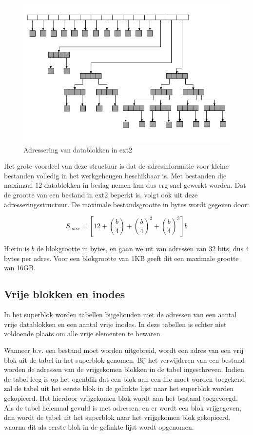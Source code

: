 \begin{figure}
\begin{center}
\includegraphics[width=120mm]{images/fig0419.png}
\caption{Adressering van datablokken in ext2}
\label{extAdressering}
\end{center}
\end{figure}

Het grote voordeel van deze structuur is dat de adresinformatie voor kleine bestanden volledig in het werkgeheugen
beschikbaar is. Met bestanden die maximaal 12 datablokken in beslag nemen kan dus erg snel gewerkt worden. Dat de
grootte van een bestand in ext2 beperkt is, volgt ook uit deze adresseringsstructuur. De maximale bestandsgrootte
in bytes wordt gegeven door:

\begin{displaymath}
S_{max} = \left[12 + \left(\frac{b}{4}\right) + \left(\frac{b}{4}\right)^{2} + \left(\frac{b}{4}\right)^{3}\right]b
\end{displaymath}

Hierin is $b$ de blokgrootte in bytes, en gaan we uit van adressen van 32 bits, dus 4 bytes per adres. Voor een
blokgrootte van 1KB geeft dit een maximale grootte van 16GB.

\subsection{Vrije blokken en inodes}

In het superblok worden tabellen bijgehouden met de adressen van een aantal vrije datablokken en een aantal vrije
inodes. In deze tabellen is echter niet voldoende plaats om alle vrije elementen te bewaren.

Wanneer b.v. een bestand moet worden uitgebreid, wordt een adres van een vrij blok uit de tabel in het superblok
genomen. Bij het verwijderen van een bestand worden de adressen van de vrijgekomen blokken in de tabel ingeschreven.
Indien de tabel leeg is op het ogenblik dat een blok aan een file moet worden toegekend zal de tabel uit het eerste
blok in de gelinkte lijst naar het superblok worden gekopieerd. Het hierdoor vrijgekomen blok wordt aan het bestand
toegevoegd. Als de tabel helemaal gevuld is met adressen, en er wordt een blok vrijgegeven, dan wordt de tabel uit
het superblok naar het vrijgekomen blok gekopieerd, waarna dit als eerste blok in de gelinkte lijst wordt opgenomen.

